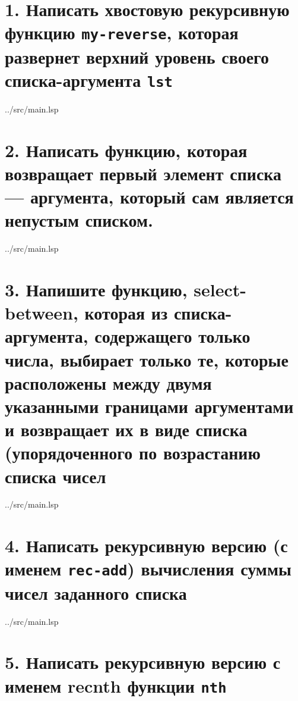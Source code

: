 \section*{1. Написать хвостовую рекурсивную функцию \texttt{my-reverse}, которая развернет верхний уровень своего списка-аргумента \texttt{lst}}

\begin{lstinputlisting}[
	caption={Задание 1},
	label={lst:t1},
	style={lsp},
	linerange={1-4},
	]{../src/main.lsp}
\end{lstinputlisting}

\section*{2. Написать функцию, которая возвращает первый элемент списка --- аргумента, который сам является непустым списком.}

\begin{lstinputlisting}[
	caption={Задание 2},
	label={lst:t2},
	style={lsp},
	linerange={6-9},
	]{../src/main.lsp}
\end{lstinputlisting}

\section*{3. Напишите функцию, select-between, которая из списка-аргумента, содержащего только числа, выбирает только те, которые расположены между двумя указанными границами аргументами и возвращает их в виде списка (упорядоченного по возрастанию списка чисел}

\begin{lstinputlisting}[
	caption={Задание 3},
	label={lst:t3},
	style={lsp},
	linerange={11-17},
	]{../src/main.lsp}
\end{lstinputlisting}

\section*{4. Написать рекурсивную версию (с именем \texttt{rec-add}) вычисления суммы чисел заданного списка}

\begin{lstinputlisting}[
	caption={Задание 4},
	label={lst:t4},
	style={lsp},
	linerange={19-22},
	]{../src/main.lsp}
\end{lstinputlisting}

\section*{5. Написать рекурсивную версию с именем recnth функции \texttt{nth}}

